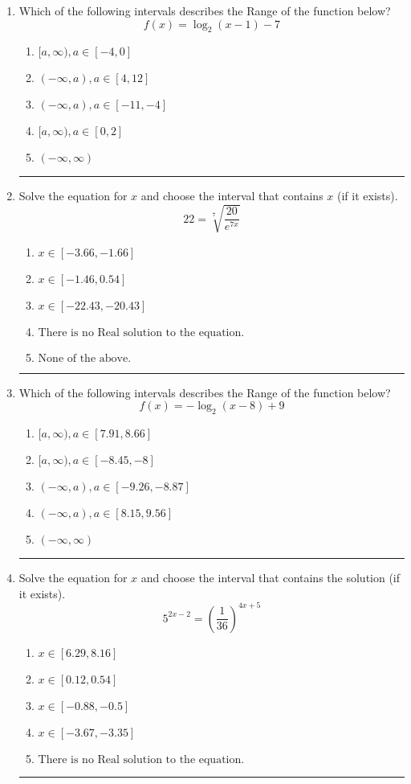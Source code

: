 \documentclass[14pt]{extbook}
\newcommand{\litem}[1]{\item#1\hspace*{-1cm}\rule{\textwidth}{0.4pt}}
\begin{document}
\begin{enumerate}
{\begin{enumerate}[label=\Alph*.]
\end{enumerate} }
\litem{
Which of the following intervals describes the Range of the function below?\[ f(x) = \log_2{(x-1)}-7 \]\begin{enumerate}[label=\Alph*.]
\item \( [a, \infty), a \in [-4, 0] \)
\item \( (-\infty, a), a \in [4, 12] \)
\item \( (-\infty, a), a \in [-11, -4] \)
\item \( [a, \infty), a \in [0, 2] \)
\item \( (-\infty, \infty) \)

\end{enumerate} }
\litem{
 Solve the equation for $x$ and choose the interval that contains $x$ (if it exists).\[  22 = \sqrt[7]{\frac{20}{e^{7x}}} \]\begin{enumerate}[label=\Alph*.]
\item \( x \in [-3.66, -1.66] \)
\item \( x \in [-1.46, 0.54] \)
\item \( x \in [-22.43, -20.43] \)
\item \( \text{There is no Real solution to the equation.} \)
\item \( \text{None of the above.} \)

\end{enumerate} }
\litem{
Which of the following intervals describes the Range of the function below?\[ f(x) = -\log_2{(x-8)}+9 \]\begin{enumerate}[label=\Alph*.]
\item \( [a, \infty), a \in [7.91, 8.66] \)
\item \( [a, \infty), a \in [-8.45, -8] \)
\item \( (-\infty, a), a \in [-9.26, -8.87] \)
\item \( (-\infty, a), a \in [8.15, 9.56] \)
\item \( (-\infty, \infty) \)

\end{enumerate} }
\litem{
Solve the equation for $x$ and choose the interval that contains the solution (if it exists).\[ 5^{2x-2} = \left(\frac{1}{36}\right)^{4x+5} \]\begin{enumerate}[label=\Alph*.]
\item \( x \in [6.29, 8.16] \)
\item \( x \in [0.12, 0.54] \)
\item \( x \in [-0.88, -0.5] \)
\item \( x \in [-3.67, -3.35] \)
\item \( \text{There is no Real solution to the equation.} \)


\end{enumerate}}
\end{enumerate}
\end{document}
